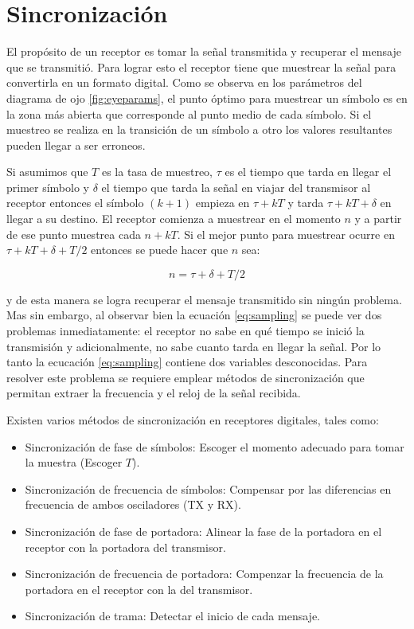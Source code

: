 \section{Sincronizaci\'on}
El prop\'osito de un receptor es tomar la se\~nal transmitida y recuperar el mensaje que se transmiti\'o. Para lograr esto el
receptor tiene que muestrear la se\~nal para convertirla en un formato digital. Como se observa en los par\'ametros del diagrama de
ojo \ref{fig:eyeparams}, el punto \'optimo para muestrear un s\'imbolo es en la zona m\'as abierta que corresponde al punto medio
de cada s\'imbolo. Si el muestreo se realiza en la transici\'on de un s\'imbolo a otro los valores resultantes pueden llegar a ser
erroneos.

Si asumimos que $T$ es la tasa de muestreo, $\tau$ es el tiempo que tarda en llegar el primer s\'imbolo y $\delta$ el tiempo que
tarda la se\~nal en viajar del transmisor al receptor entonces el s\'imbolo $(k+1)$ empieza en $\tau+kT$ y tarda $\tau+kT+\delta$
en llegar a su destino. El receptor comienza a muestrear en el momento $n$ y a partir de ese punto muestrea cada $n+kT$. Si el
mejor punto para muestrear ocurre en $\tau+kT+ \delta + T/2$ entonces se puede hacer que $n$ sea:

\begin{equation}\label{eq:sampling}
n=\tau+\delta+T/2
\end{equation}

y de esta manera se logra recuperar el mensaje transmitido sin ning\'un problema. Mas sin embargo, al observar bien la ecuaci\'on
\ref{eq:sampling} se puede ver dos problemas inmediatamente: el receptor no sabe en qu\'e tiempo se inici\'o la transmisi\'on y
adicionalmente, no sabe cuanto tarda en llegar la se\~nal. Por lo tanto la ecucaci\'on \ref{eq:sampling} contiene dos
variables desconocidas. Para resolver este problema se requiere emplear m\'etodos de sincronizaci\'on que permitan extraer la
frecuencia y el reloj de la se\~nal recibida.

Existen varios m\'etodos de sincronizaci\'on en receptores digitales, tales como:

\begin{itemize}
  \item Sincronizaci\'on de fase de s\'imbolos: Escoger el momento adecuado para tomar la muestra (Escoger $T$).
  \item Sincronizaci\'on de frecuencia de s\'imbolos: Compensar por las diferencias en frecuencia de ambos osciladores (TX y RX).
  \item Sincronizaci\'on de fase de portadora: Alinear la fase de la portadora en el receptor con la portadora del transmisor.
  \item Sincronizaci\'on de frecuencia de portadora: Compenzar la frecuencia de la portadora en el receptor con la del
  transmisor.
  \item Sincronizaci\'on de trama: Detectar el inicio de cada mensaje.
\end{itemize}

